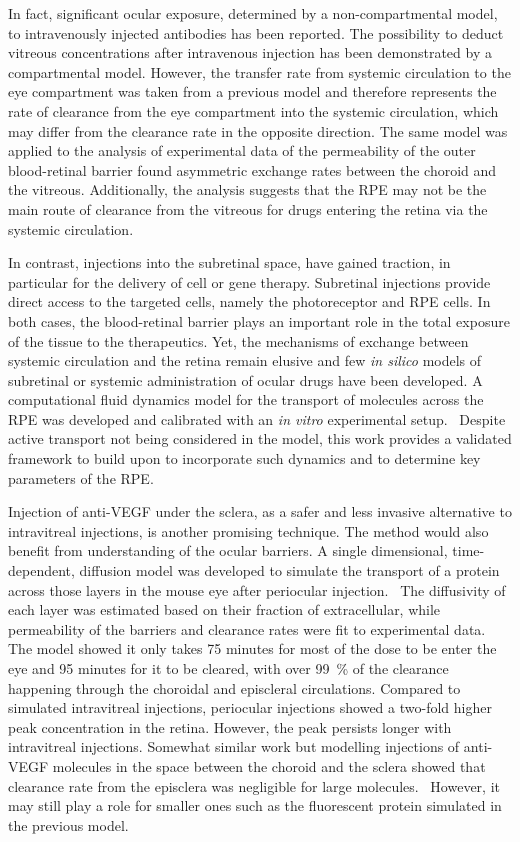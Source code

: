 \documentclass[12pt,a4paper]{journal}
\begin{document}
In fact, significant ocular exposure, determined by a non-compartmental model, to intravenously injected antibodies has been reported.\cite{Shivva_2021}
The possibility to deduct vitreous concentrations after intravenous injection has been demonstrated by a compartmental model.\cite{Vellonen_2015}
However, the transfer rate from systemic circulation to the eye compartment was taken from a previous model and therefore represents the rate of clearance from the eye compartment into the systemic circulation, which may differ from the clearance rate in the opposite direction.
The same model was applied to the analysis of experimental data of the permeability of the outer blood-retinal barrier found asymmetric exchange rates between the choroid and the vitreous.\cite{Ramsay_2019}
Additionally, the analysis suggests that the RPE may not be the main route of clearance from the vitreous for drugs entering the retina via the systemic circulation.\cite{Ramsay_2019}

In contrast, injections into the subretinal space, have gained traction, in particular for the delivery of cell or gene therapy.
Subretinal injections provide direct access to the targeted cells, namely the photoreceptor and RPE cells.
In both cases, the blood-retinal barrier plays an important role in the total exposure of the tissue to the therapeutics.
Yet, the mechanisms of exchange between systemic circulation and the retina remain elusive and few \textit{in silico} models of subretinal or systemic administration of ocular drugs have been developed.
A computational fluid dynamics model for the transport of molecules across the RPE was developed and calibrated with an \textit{in vitro} experimental setup.~\cite{Davies_2020}
Despite active transport not being considered in the model, this work provides a validated framework to build upon to incorporate such dynamics and to determine key parameters of the RPE.

Injection of anti-VEGF under the sclera, as a safer and less invasive alternative to intravitreal injections, is another promising technique.
The method would also benefit from understanding of the ocular barriers.
A single dimensional, time-dependent, diffusion model was developed to simulate the transport of a protein across those layers in the mouse eye after periocular injection.~\cite{Gabhann_2007}
The diffusivity of each layer was estimated based on their fraction of extracellular, while permeability of the barriers and clearance rates were fit to experimental data.
The model showed it only takes 75 minutes for most of the dose to be enter the eye and 95 minutes for it to be cleared, with over \SI{99}{\percent} of the clearance happening through the choroidal and episcleral circulations.
Compared to simulated intravitreal injections, periocular injections showed a two-fold higher peak concentration in the retina.
However, the peak persists longer with intravitreal injections.
Somewhat similar work but modelling injections of anti-VEGF molecules in the space between the choroid and the sclera showed that clearance rate from the episclera was negligible for large molecules.~\cite{Zhang_2018}
However, it may still play a role for smaller ones such as the fluorescent protein simulated in the previous model.~\cite{Gabhann_2007}
\end{document}
